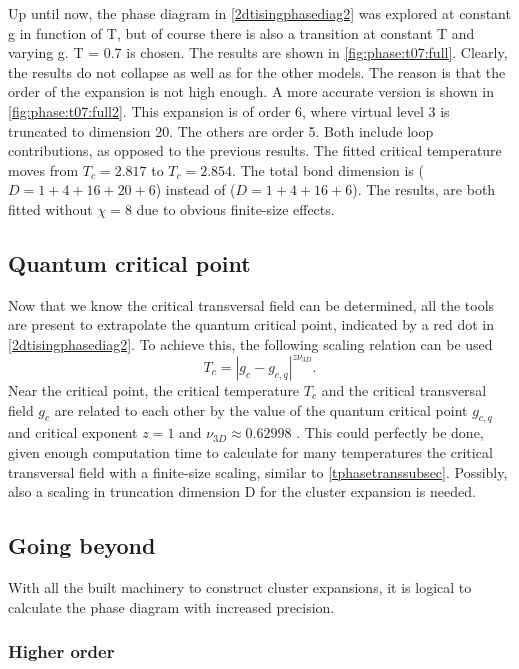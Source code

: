 \noindent
Up until now, the phase diagram in \cref{2dtisingphasediag2} was explored at constant g in function of T, but of course there is also a transition at constant T and varying g.  T = 0.7 is chosen. The results are shown in \cref{fig:phase:t07:full}. Clearly, the results do not collapse as well as for the other models. The reason is that the order of the expansion is not high enough.
A more accurate version is shown in \cref{fig:phase:t07:full2}. This expansion is of order 6, where virtual level 3 is truncated to dimension 20. The others are order 5. Both include loop contributions, as opposed to the previous results. The fitted critical temperature moves from $T_c = 2.817$ to $T_c = 2.854$. The total bond dimension is ($D = 1+4+16+20 +6$) instead of ($D = 1+4+16 +6 $). The results, are both fitted without $\chi=8$ due to obvious finite-size effects.

\subsection{Quantum critical point}\label{subsec:tricrit}

Now that we know the critical transversal field can be determined, all the tools are present to extrapolate the quantum critical point, indicated by a red dot in \cref{2dtisingphasediag2}. To achieve this, the following scaling relation can be used
\begin{equation}
  T_c = \left| g_c-g_{c,q} \right|^{z \nu_{3D}} .
\end{equation}
Near the critical point, the critical temperature $T_c$ and the critical transversal field $g_c$ are related to each other by the value of the quantum critical point $g_{c,q}$ and critical exponent $z=1$ and $\nu_{3D} \approx 0.62998$ \cite{Hesselmann2016}. This could perfectly be done, given enough computation time to calculate for many temperatures the critical transversal field with a finite-size scaling, similar to \cref{tphasetranssubsec}. Possibly, also a scaling in truncation dimension D for the cluster expansion is needed.

\subsection{Going beyond}
With all the built machinery to construct cluster expansions, it is logical to calculate the phase diagram with increased precision.

\subsubsection{Higher order}

